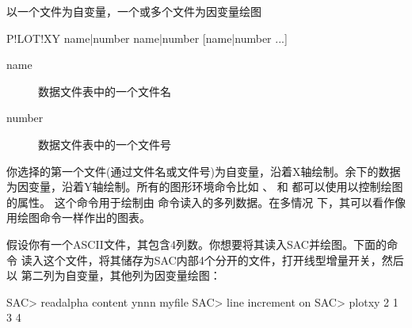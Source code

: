 \label{cmd:plotxy}

以一个文件为自变量，一个或多个文件为因变量绘图

\begin{SACSTX}
P!LOT!XY name|number name|number [name|number ...]
\end{SACSTX}

\begin{description}
\item [name] 数据文件表中的一个文件名
\item [number] 数据文件表中的一个文件号
\end{description}

你选择的第一个文件(通过文件名或文件号)为自变量，沿着X轴绘制。余下的数据
为因变量，沿着Y轴绘制。所有的图形环境命令比如 、
 和  都可以使用以控制绘图的属性。
这个命令用于绘制由  命令读入的多列数据。在多情况
下，其可以看作像用绘图命令一样作出的图表。

假设你有一个ASCII文件，其包含4列数。你想要将其读入SAC并绘图。下面的命令
读入这个文件，将其储存为SAC内部4个分开的文件，打开线型增量开关，然后以
第二列为自变量，其他列为因变量绘图：
\begin{SACCode}
SAC> readalpha content ynnn myfile
SAC> line increment on
SAC> plotxy 2 1 3 4
\end{SACCode}

